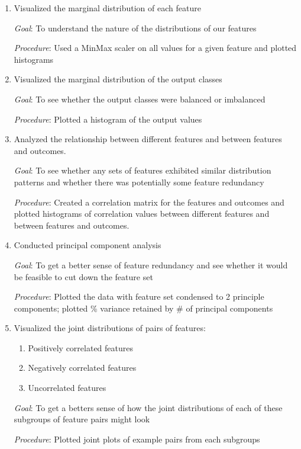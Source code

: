 \documentclass[12pt]{article}
\begin{document}
\begin{enumerate}
\item Visualized the marginal distribution of each feature

\textit{Goal}: To understand the nature of the distributions of our features

\textit{Procedure}: Used a MinMax scaler on all values for a given feature and plotted histograms

\item Visualized the marginal distribution of the output classes

\textit{Goal}: To see whether the output classes were balanced or imbalanced

\textit{Procedure}: Plotted a histogram of the output values

\item Analyzed the relationship between different features and between features and outcomes.

\textit{Goal}: To see whether any sets of features exhibited similar distribution patterns and whether there was potentially some feature redundancy

\textit{Procedure}: Created a correlation matrix for the features and outcomes and plotted histograms of correlation values between different features and between features and outcomes.

\item Conducted principal component analysis

\textit{Goal}: To get a better sense of feature redundancy and see whether it would be feasible to cut down the feature set

\textit{Procedure}: Plotted the data with feature set condensed to 2 principle components; plotted \% variance retained by \# of principal components

\item Visualized the joint distributions of pairs of features:
\begin{enumerate}
\item Positively correlated features
\item Negatively correlated features
\item Uncorrelated features
\end{enumerate}

\textit{Goal}: To get a betters sense of how the joint distributions of each of these subgroups of feature pairs might look

\textit{Procedure}: Plotted joint plots of example pairs from each subgroups

\end{enumerate}
\end{document}

